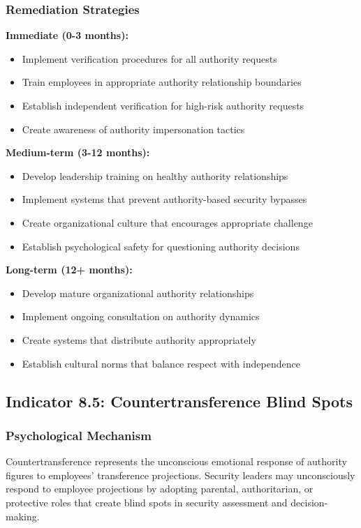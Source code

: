\documentclass[11pt,a4paper]{article}
\begin{document}
\subsubsection{Remediation Strategies}

\textbf{Immediate (0-3 months):}
\begin{itemize}
\item Implement verification procedures for all authority requests
\item Train employees in appropriate authority relationship boundaries
\item Establish independent verification for high-risk authority requests
\item Create awareness of authority impersonation tactics
\end{itemize}

\textbf{Medium-term (3-12 months):}
\begin{itemize}
\item Develop leadership training on healthy authority relationships
\item Implement systems that prevent authority-based security bypasses
\item Create organizational culture that encourages appropriate challenge
\item Establish psychological safety for questioning authority decisions
\end{itemize}

\textbf{Long-term (12+ months):}
\begin{itemize}
\item Develop mature organizational authority relationships
\item Implement ongoing consultation on authority dynamics
\item Create systems that distribute authority appropriately
\item Establish cultural norms that balance respect with independence
\end{itemize}

\subsection{Indicator 8.5: Countertransference Blind Spots}

\subsubsection{Psychological Mechanism}

Countertransference represents the unconscious emotional response of authority figures to employees' transference projections. Security leaders may unconsciously respond to employee projections by adopting parental, authoritarian, or protective roles that create blind spots in security assessment and decision-making\cite{racker1968}.
\end{document}
